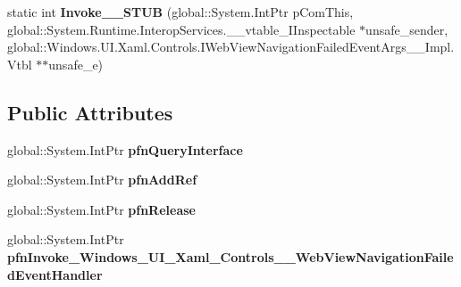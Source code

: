 \begin{DoxyCompactItemize}
\item 
\mbox{\label{struct_windows_1_1_u_i_1_1_xaml_1_1_controls_1_1_web_view_navigation_failed_event_handler_____impl_1_1_vtbl_ad72f33645ffec7b00bb806acac7203e7}} 
static int {\bfseries Invoke\+\_\+\+\_\+\+S\+T\+UB} (global\+::\+System.\+Int\+Ptr p\+Com\+This, global\+::\+System.\+Runtime.\+Interop\+Services.\+\_\+\+\_\+vtable\+\_\+\+I\+Inspectable $\ast$unsafe\+\_\+sender, global\+::\+Windows.\+U\+I.\+Xaml.\+Controls.\+I\+Web\+View\+Navigation\+Failed\+Event\+Args\+\_\+\+\_\+\+Impl.\+Vtbl $\ast$$\ast$unsafe\+\_\+e)
\end{DoxyCompactItemize}
\subsection*{Public Attributes}
\begin{DoxyCompactItemize}
\item 
\mbox{\label{struct_windows_1_1_u_i_1_1_xaml_1_1_controls_1_1_web_view_navigation_failed_event_handler_____impl_1_1_vtbl_a851264c60087077abfa0cf35f1219b55}} 
global\+::\+System.\+Int\+Ptr {\bfseries pfn\+Query\+Interface}
\item 
\mbox{\label{struct_windows_1_1_u_i_1_1_xaml_1_1_controls_1_1_web_view_navigation_failed_event_handler_____impl_1_1_vtbl_a9e43c54df98ca73f2c2fcba49a7a45a6}} 
global\+::\+System.\+Int\+Ptr {\bfseries pfn\+Add\+Ref}
\item 
\mbox{\label{struct_windows_1_1_u_i_1_1_xaml_1_1_controls_1_1_web_view_navigation_failed_event_handler_____impl_1_1_vtbl_ad69f475f3ab85cac47bdc157d035ee40}} 
global\+::\+System.\+Int\+Ptr {\bfseries pfn\+Release}
\item 
\mbox{\label{struct_windows_1_1_u_i_1_1_xaml_1_1_controls_1_1_web_view_navigation_failed_event_handler_____impl_1_1_vtbl_aadf902d002fcc4e1f1b9b8266056a217}} 
global\+::\+System.\+Int\+Ptr {\bfseries pfn\+Invoke\+\_\+\+Windows\+\_\+\+U\+I\+\_\+\+Xaml\+\_\+\+Controls\+\_\+\+\_\+\+Web\+View\+Navigation\+Failed\+Event\+Handler}
\end{DoxyCompactItemize}
